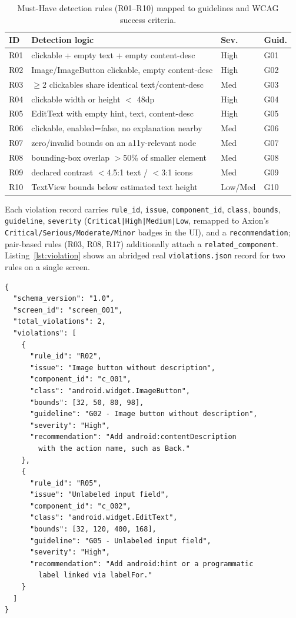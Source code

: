\documentclass[10pt,conference]{IEEEtran}
\begin{document}
\begin{table}[!t]
\caption{Must-Have detection rules (R01--R10) mapped to guidelines and WCAG success criteria.}
\label{tab:rules}
\centering
\scriptsize
\begin{tabular}{@{}p{0.35cm}p{4.3cm}p{0.9cm}p{0.9cm}@{}}
\toprule
\textbf{ID} & \textbf{Detection logic} & \textbf{Sev.} & \textbf{Guid.} \\
\midrule
R01 & clickable + empty text + empty content-desc & High & G01 \\
R02 & Image/ImageButton clickable, empty content-desc & High & G02 \\
R03 & $\geq$2 clickables share identical text/content-desc & Med & G03 \\
R04 & clickable width or height $<$ 48dp & High & G04 \\
R05 & EditText with empty hint, text, content-desc & High & G05 \\
R06 & clickable, enabled=false, no explanation nearby & Med & G06 \\
R07 & zero/invalid bounds on an a11y-relevant node & Med & G07 \\
R08 & bounding-box overlap $>$50\% of smaller element & Med & G08 \\
R09 & declared contrast $<$4.5:1 text / $<$3:1 icons & Med & G09 \\
R10 & TextView bounds below estimated text height & Low/Med & G10 \\
\bottomrule
\end{tabular}
\end{table}

Each violation record carries \texttt{rule\_id}, \texttt{issue}, \texttt{component\_id}, \texttt{class}, \texttt{bounds}, \texttt{guideline}, \texttt{severity} (\texttt{Critical|High|Medium|Low}, remapped to Axion's \texttt{Critical/Serious/Moderate/Minor} badges in the UI), and a \texttt{recommendation}; pair-based rules (R03, R08, R17) additionally attach a \texttt{related\_component}. Listing~\ref{lst:violation} shows an abridged real \texttt{violations.json} record for two rules on a single screen.

\begin{lstlisting}[style=jsonstyle, caption={Abridged \texttt{violations.json} excerpt showing R02 and R05.}, label={lst:violation}]
{
  "schema_version": "1.0",
  "screen_id": "screen_001",
  "total_violations": 2,
  "violations": [
    {
      "rule_id": "R02",
      "issue": "Image button without description",
      "component_id": "c_001",
      "class": "android.widget.ImageButton",
      "bounds": [32, 50, 80, 98],
      "guideline": "G02 - Image button without description",
      "severity": "High",
      "recommendation": "Add android:contentDescription
        with the action name, such as Back."
    },
    {
      "rule_id": "R05",
      "issue": "Unlabeled input field",
      "component_id": "c_002",
      "class": "android.widget.EditText",
      "bounds": [32, 120, 400, 168],
      "guideline": "G05 - Unlabeled input field",
      "severity": "High",
      "recommendation": "Add android:hint or a programmatic
        label linked via labelFor."
    }
  ]
}
\end{lstlisting}
\end{document}
